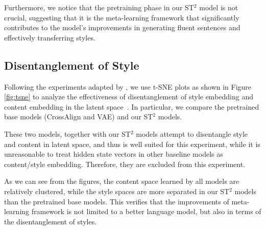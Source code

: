 Furthermore, we notice that the pretraining phase in our ST$^2$ model is not crucial, suggesting that it is the meta-learning framework that significantly contributes to the model's improvements in generating fluent sentences and effectively transferring styles.

\subsection{Disentanglement of Style}
\label{sec:disentangle}

Following the experiments adapted by \citet{john2018disentangled}, we use t-SNE plots as shown in Figure \ref{fig:tsne} to analyze the effectiveness of disentanglement of style embedding and content embedding in the latent space~\citep{maaten2008visualizing}. In particular, we compare the pretrained base models (CrossAlign and VAE) and our ST$^2$ models.




These two models, together with our ST$^2$ models attempt to disentangle style and content in latent space, and thus is well suited for this experiment, while it is unreasonable to treat hidden state vectors in other baseline models as content/style embedding. Therefore, they are excluded from this experiment.

As we can see from the figures, the content space learned by all models are relatively clustered, while the style spaces are more separated in our ST$^2$ models than the pretrained base models. This verifies that the improvements of meta-learning framework is not limited to a better language model, but also in terms of the disentanglement of styles.


